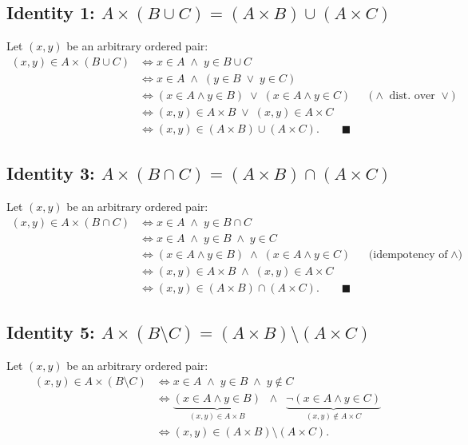 \documentclass[12pt, a4paper]{article}
\begin{document}
\medskip
\subsection*{Identity 1:\; $A \times (B \cup C) = (A \times B) \cup (A \times C)$}

Let $(x, y)$ be an arbitrary ordered pair:
\begin{align*}
  (x,y) \in A \times (B \cup C)
  &\iff x \in A \;\land\; y \in B \cup C \\
  &\iff x \in A \;\land\; (y \in B \;\lor\; y \in C) \\
  &\iff (x \in A \land y \in B)
        \;\lor\; (x \in A \land y \in C)
        && \text{($\land$ dist.\ over $\lor$)} \\
  &\iff (x,y) \in A \times B \;\lor\; (x,y) \in A \times C \\
  &\iff (x,y) \in (A \times B) \cup (A \times C).
  \qquad \blacksquare
\end{align*}

\subsection*{Identity 3:\; $A \times (B \cap C) = (A \times B) \cap (A \times C)$}

Let $(x, y)$ be an arbitrary ordered pair:
\begin{align*}
  (x,y) \in A \times (B \cap C)
  &\iff x \in A \;\land\; y \in B \cap C \\
  &\iff x \in A \;\land\; y \in B \;\land\; y \in C \\
  &\iff (x \in A \land y \in B)
        \;\land\; (x \in A \land y \in C)
        && \text{(idempotency of $\land$)} \\
  &\iff (x,y) \in A \times B \;\land\; (x,y) \in A \times C \\
  &\iff (x,y) \in (A \times B) \cap (A \times C).
  \qquad \blacksquare
\end{align*}

\subsection*{Identity 5:\; $A \times (B \setminus C) = (A \times B) \setminus (A \times C)$}

Let $(x, y)$ be an arbitrary ordered pair:
\begin{align*}
  (x,y) \in A \times (B \setminus C)
  &\iff x \in A \;\land\; y \in B \;\land\; y \notin C \\[4pt]
  &\iff \underbrace{(x \in A \land y \in B)}_{\displaystyle (x,y)\in A\times B}
        \;\;\land\;\;
        \underbrace{\lnot(x \in A \land y \in C)}_{\displaystyle (x,y)\notin A\times C}
        \tag{$\star$} \\[4pt]
  &\iff (x,y) \in (A \times B) \setminus (A \times C).
\end{align*}
\end{document}
